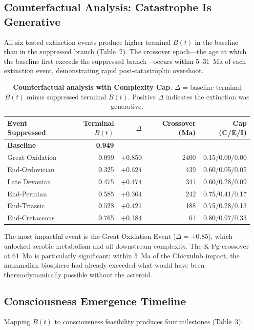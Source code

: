 \documentclass[10pt,letterpaper]{article}
\newcommand{\bt}{$B(t)$}
\begin{document}
\subsection*{Counterfactual Analysis: Catastrophe Is Generative}

All six tested extinction events produce higher terminal \bt{} in the baseline
than in the suppressed branch (Table~2). The crossover epoch---the age at which
the baseline first exceeds the suppressed branch---occurs within 5--31~Ma of each
extinction event, demonstrating rapid post-catastrophic overshoot.

\begin{table}[H]
\caption{{\bf Counterfactual analysis with Complexity Cap.}
$\Delta$ = baseline terminal $B(t)$ minus suppressed terminal $B(t)$.
Positive $\Delta$ indicates the extinction was generative.}
\begin{tabular}{lrrrr}
\toprule
Event Suppressed & Terminal $B(t)$ & $\Delta$ & Crossover (Ma) & Cap (C/E/I) \\
\midrule
\textbf{Baseline} & \textbf{0.949} & --- & --- & --- \\
Great Oxidation & 0.099 & +0.850 & 2400 & 0.15/0.00/0.00 \\
End-Ordovician & 0.325 & +0.624 & 439 & 0.60/0.05/0.05 \\
Late Devonian & 0.475 & +0.474 & 341 & 0.60/0.28/0.09 \\
End-Permian & 0.585 & +0.364 & 242 & 0.75/0.41/0.17 \\
End-Triassic & 0.528 & +0.421 & 188 & 0.75/0.28/0.13 \\
End-Cretaceous & 0.765 & +0.184 & 61 & 0.80/0.97/0.33 \\
\bottomrule
\end{tabular}
\end{table}

The most impactful event is the Great Oxidation Event ($\Delta = +0.85$), which
unlocked aerobic metabolism and all downstream complexity. The K-Pg crossover at
61~Ma is particularly significant: within 5~Ma of the Chicxulub impact, the
mammalian biosphere had already exceeded what would have been thermodynamically
possible without the asteroid.

\subsection*{Consciousness Emergence Timeline}

Mapping \bt{} to consciousness feasibility produces four milestones (Table~3):
\end{document}
